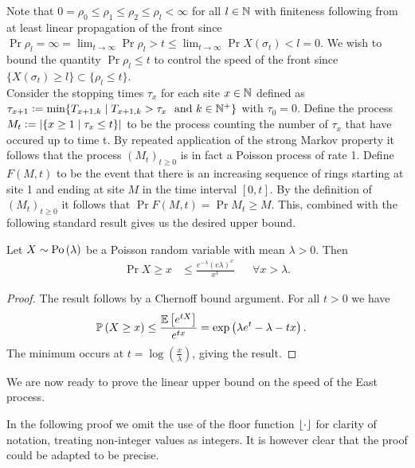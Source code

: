 Note that $0 = \rho_0 \leq \rho_1 \leq \rho_2 \leq \rho_l < \infty$ for all $l \in \mathbb{N}$ with finiteness following from at least linear propagation of the front since $\Pr{\rho_l = \infty} = \lim_{t \rightarrow \infty} \Pr{\rho_l > t} \leq \lim_{t \rightarrow \infty} \Pr{X\left( \sigma_t\right) < l} = 0$. We wish to bound the quantity $\Pr{\rho_l \leq t}$ to control the speed of the front since  $\{X \left( \sigma_t \right) \geq l \} \subset \{\rho_l \leq t \}$. \\

Consider the stopping times $\tau_x$ for each site $x \in \mathbb{N}$ defined as $\tau_{x+1} \vcentcolon= \min\{ T_{x+1, k} \mid T_{x+1, k} > \tau_x\ \text{ and } k \in \mathbb{N}^+ \}$ with $\tau_0 = 0$. Define the process $M_t \vcentcolon= |\{x \geq 1 \mid \tau_x \leq t \}|$ to be the process counting the number of $\tau_x$ that have occured up to time t. By repeated application of the strong Markov property it follows that the process $(M_t)_{t \geq 0}$ is in fact a Poisson process of rate 1. Define $F(M, t)$ to be the event that there is an increasing sequence of rings starting at site 1 and ending at site $M$ in the time interval $[0, t]$. By the definition of $(M_t)_{t \geq 0}$ it follows that $\Pr{F(M, t)} = \Pr{M_t \geq M}$. This, combined with the following standard result gives us the desired upper bound. 

\begin{lemma}\label{lem:chernoff}
Let $X \sim \text{Po} \left( \lambda \right)$ be a Poisson random variable with mean $\lambda > 0$. Then 
\begin{align*}
\Pr{X \geq x} &\leq \frac{e^{-\lambda}(e \lambda)^x}{x^x} &&\forall x > \lambda. 
\end{align*} 
\end{lemma}

\begin{proof}
The result follows by a Chernoff bound argument. For all $t > 0$ we have
\begin{align*}
\mathbb{P} \left( X \geq x \right) &\leq \frac{\mathbb{E}\left[ e^{tX} \right]}{e^{tx}} = \exp\left( \lambda e^t - \lambda - tx \right). 
\end{align*} 
The minimum occurs at $t = \log\left( \frac{x}{\lambda} \right)$, giving the result. 
\end{proof}

We are now ready to prove the linear upper bound on the speed of the East process.

\begin{remark}
In the following proof we omit the use of the floor function $\lfloor\cdot\rfloor$ for clarity of notation, treating non-integer values as integers. It is however clear that the proof could be adapted to be precise. 
\end{remark}

